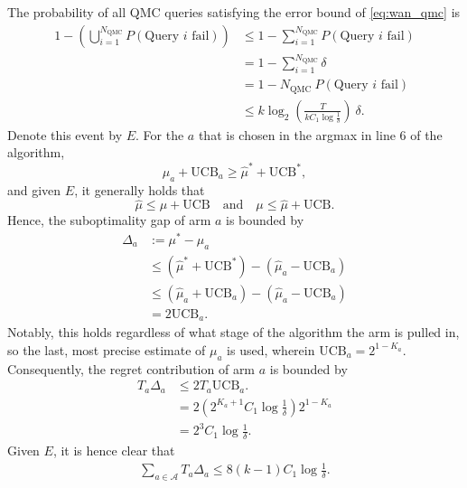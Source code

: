 The probability of all QMC queries satisfying the error bound of \cref{eq:wan_qmc} is
\begin{equation}
    \begin{aligned}
        1 - \left(\bigcup_{i = 1}^{N_{\text{QMC}}} P(\text{Query } i \text{ fail}) \right)
         & \leq
        1 - \sum_{i = 1}^{N_{\text{QMC}}} P(\text{Query } i \text{ fail})             \\
         & =
        1 - \sum_{i = 1}^{N_{\text{QMC}}} \delta                                      \\
         & =
        1 - N_{\text{QMC}} \ P(\text{Query } i \text{ fail})                          \\
         & \leq k \log_2 \left(\frac{T}{k C_1 \log \frac{1}{\delta}}\right) \ \delta.
    \end{aligned}
\end{equation}
Denote this event by $E$.
For the $a$ that is chosen in the argmax in line 6 of the algorithm,
\begin{equation}
    \hat\mu_a + \text{UCB}_a \geq \hat\mu^* + \text{UCB}^*,
\end{equation}
and given $E$, it generally holds that
\begin{equation}
    \hat\mu \leq \mu + \text{UCB}
    \quad \text{and} \quad
    \mu \leq \hat\mu + \text{UCB}.
\end{equation}
Hence, the suboptimality gap of arm $a$ is bounded by
\begin{equation}
    \begin{aligned}
        \Delta_a & := \mu^* - \mu_a                                             \\
                 & \leq (\hat\mu^* + \text{UCB}^*) - (\hat\mu_a - \text{UCB}_a) \\
                 & \leq (\hat\mu_a + \text{UCB}_a) - (\hat\mu_a - \text{UCB}_a) \\
                 & = 2 \text{UCB}_a.
    \end{aligned}
\end{equation}
Notably, this holds regardless of what stage of the algorithm the arm is pulled in, so the last, most precise estimate of $\mu_a$ is used, wherein $\text{UCB}_a = 2^{1 - K_a}$.
Consequently, the regret contribution of arm $a$ is bounded by
\begin{equation}
    \begin{aligned}
        T_a \Delta_a & \leq 2 T_a \text{UCB}_a.                            \\
                     & = 2 (2^{K_a + 1} C_1 \log \frac1\delta) 2^{1 - K_a} \\
                     & = 2^3 C_1 \log \frac1\delta.
    \end{aligned}
\end{equation}
Given $E$, it is hence clear that
\begin{equation}
    \begin{aligned}
        \sum_{a \in \mathcal{A}} T_a \Delta_a  \leq 8 (k-1) C_1 \log \frac1\delta.
    \end{aligned}
\end{equation}

